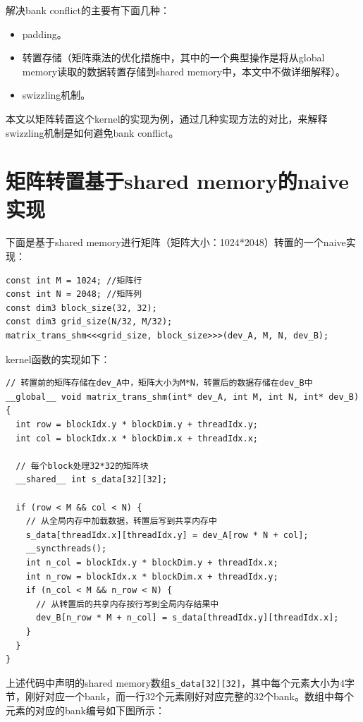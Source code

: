 解决bank conflict的主要有下面几种：

\begin{itemize}
  \item padding。
  \item 转置存储（矩阵乘法的优化措施中，其中的一个典型操作是将从global memory读取的数据转置存储到shared memory中，本文中不做详细解释）。
  \item swizzling机制。
\end{itemize}

本文以矩阵转置这个kernel的实现为例，通过几种实现方法的对比，来解释swizzling机制是如何避免bank conflict。

\section{矩阵转置基于shared memory的naive实现}

下面是基于shared memory进行矩阵（矩阵大小：1024*2048）转置的一个naive实现：

\begin{lstlisting}
const int M = 1024; //矩阵行
const int N = 2048; //矩阵列
const dim3 block_size(32, 32);
const dim3 grid_size(N/32, M/32);
matrix_trans_shm<<<grid_size, block_size>>>(dev_A, M, N, dev_B);
\end{lstlisting}

kernel函数的实现如下：

\begin{lstlisting}
// 转置前的矩阵存储在dev_A中，矩阵大小为M*N，转置后的数据存储在dev_B中
__global__ void matrix_trans_shm(int* dev_A, int M, int N, int* dev_B) {
  int row = blockIdx.y * blockDim.y + threadIdx.y;
  int col = blockIdx.x * blockDim.x + threadIdx.x;

  // 每个block处理32*32的矩阵块
  __shared__ int s_data[32][32];

  if (row < M && col < N) {
    // 从全局内存中加载数据，转置后写到共享内存中
    s_data[threadIdx.x][threadIdx.y] = dev_A[row * N + col];
    __syncthreads();
    int n_col = blockIdx.y * blockDim.y + threadIdx.x;
    int n_row = blockIdx.x * blockDim.x + threadIdx.y;
    if (n_col < M && n_row < N) {
      // 从转置后的共享内存按行写到全局内存结果中
      dev_B[n_row * M + n_col] = s_data[threadIdx.y][threadIdx.x];
    }
  }
}
\end{lstlisting}

上述代码中声明的shared memory数组\lstinline|s_data[32][32]|，其中每个元素大小为4字节，刚好对应一个bank，而一行32个元素刚好对应完整的32个bank。数组中每个元素的对应的bank编号如下图所示：

